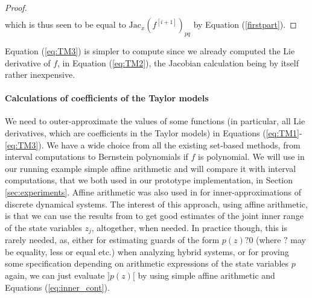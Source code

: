 \documentclass{sig-alternate-05-2015} %
\newtheorem{remark}{Remark}
\begin{document}
\begin{proof}
\begin{multline}
\end{multline}
\noindent which is thus seen to be equal to $\mbox{Jac}_x(f^{[i+1]})_{pq}$ by
Equation (\ref{firstpart}). 
\end{proof}

Equation (\ref{eq:TM3}) 
is simpler to compute since we already computed
the Lie derivative of $f$, in Equation (\ref{eq:TM2}), the Jacobian calculation being by
itself rather 
inexpensive. 

\paragraph{Calculations of coefficients of the Taylor models}

We need to outer-approximate the values of some functions (in particular, all Lie
derivatives, which are coefficients in the Taylor models) in Equations 
(\ref{eq:TM1}-\ref{eq:TM3}). We have a wide choice from all the existing set-based
methods, from interval computations to Bernstein polynomials \cite{Dang} if $f$
is polynomial. We will use in our running example simple affine arithmetic
\cite{com-sto-93-aa} and will compare it with interval computations, that we
both used in our prototype implementation, in Section \ref{sec:experiments}. 
Affine arithmetic was also used in \cite{hscc14} for inner-approximations of
discrete dynamical systems. The interest of this approach, using affine arithmetic,
is that we can use the results from \cite{rc13} to get good estimates of the
joint inner range of the state variables $z_j$, altogether, when needed. In practice
though, this is rarely needed, as, either for estimating guards of the form
$p(z) ? 0$ (where $?$ may be equality, less or equal etc.) when analyzing
hybrid systems, or for proving some specification depending on arithmetic expressions of
the state variables $p$ again, we can just evaluate $]p(z)[$ by using simple
affine arithmetic and 
Equations (\ref{eq:inner_cont}). 
\end{document}
